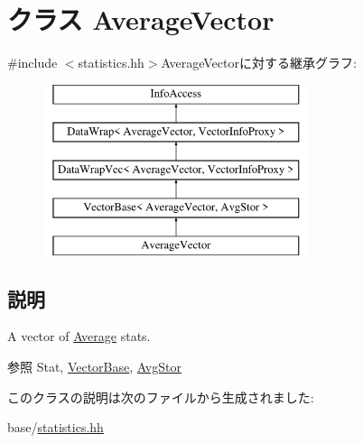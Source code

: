 \hypertarget{classStats_1_1AverageVector}{
\section{クラス AverageVector}
\label{classStats_1_1AverageVector}
}


{\ttfamily \#include $<$statistics.hh$>$}AverageVectorに対する継承グラフ:\begin{figure}[H]
\begin{center}
\leavevmode
\includegraphics[height=5cm]{classStats_1_1AverageVector}
\end{center}
\end{figure}


\subsection{説明}
A vector of \hyperlink{classStats_1_1Average}{Average} stats. \begin{DoxySeeAlso}{参照}
Stat, \hyperlink{classStats_1_1VectorBase}{VectorBase}, \hyperlink{classStats_1_1AvgStor}{AvgStor} 
\end{DoxySeeAlso}


このクラスの説明は次のファイルから生成されました:\begin{DoxyCompactItemize}
\item 
base/\hyperlink{statistics_8hh}{statistics.hh}\end{DoxyCompactItemize}
